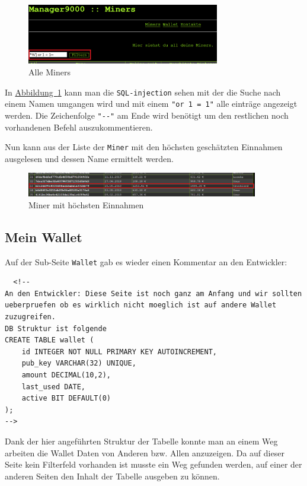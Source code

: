 \documentclass[12pt,a4paper,titlepage,oneside]{scrartcl}
\begin{document}
\begin{figure}[h!]
  \centering
  \includegraphics[width=0.75\textwidth]{./imgs/manager9000/all_miners_red.png}
\caption{Alle Miners}
\label{fig:all_miners}
\end{figure}

In \hyperref[fig:all_miners]{Abbildung~\ref*{fig:all_miners}} kann man die \lstinline{SQL-injection} sehen mit der die Suche nach einem Namen umgangen wird und mit einem \lstinline{"or 1 = 1"} alle einträge angezeigt werden. Die Zeichenfolge \lstinline{"--"} am Ende wird benötigt um den restlichen noch vorhandenen Befehl auszukommentieren.

Nun kann aus der Liste der \lstinline{Miner} mit den höchsten geschätzten Einnahmen ausgelesen und dessen Name ermittelt werden.

\begin{figure}[h!]
  \centering
  \includegraphics[width=0.9\textwidth]{./imgs/manager9000/highest_miner.png}
\caption{Miner mit höchsten Einnahmen}
\label{fig:highest_miner}
\end{figure}

\subsection{Mein Wallet}

Auf der Sub-Seite \lstinline{Wallet} gab es wieder einen Kommentar an den Entwickler:

\begin{lstlisting}
  <!--
An den Entwickler: Diese Seite ist noch ganz am Anfang und wir sollten ueberpruefen ob es wirklich nicht moeglich ist auf andere Wallet zuzugreifen.
DB Struktur ist folgende
CREATE TABLE wallet (
	id INTEGER NOT NULL PRIMARY KEY AUTOINCREMENT,
	pub_key VARCHAR(32) UNIQUE,
	amount DECIMAL(10,2),
	last_used DATE,
	active BIT DEFAULT(0)
);
-->
\end{lstlisting}

Dank der hier angeführten Struktur der Tabelle konnte man an einem Weg arbeiten die Wallet Daten von Anderen bzw. Allen anzuzeigen. Da auf dieser Seite kein Filterfeld vorhanden ist musste ein Weg gefunden werden, auf einer der anderen Seiten den Inhalt der Tabelle ausgeben zu können.
\end{document}
